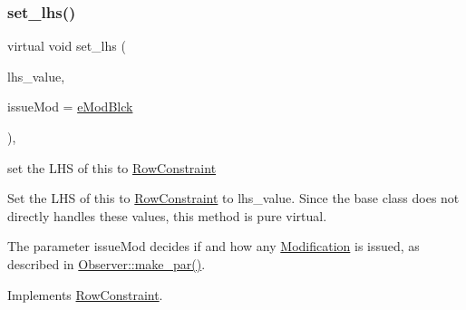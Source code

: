 \subsubsection{\texorpdfstring{set\+\_\+lhs()}{set\_lhs()}}
{\footnotesize\ttfamily virtual void set\+\_\+lhs (\begin{DoxyParamCaption}\item[{\mbox{\hyperlink{class_s_m_spp__di__unipi__it_1_1_row_constraint_a34abd4b01d3a2024be5f6d13dd88779f}{c\+\_\+\+R\+H\+S\+Value}}}]{lhs\+\_\+value,  }\item[{\mbox{\hyperlink{group___modification___t_y_p_e_s_ga544246d8c462e9a2d817c2c30797968f}{c\+\_\+\+Mod\+Param}}}]{issue\+Mod = {\ttfamily \mbox{\hyperlink{group___modification___t_y_p_e_s_gga48fddcdd03a03f49b7e389ca1ed938d4a21b14b26b1c0093a0905f6fc010bad29}{e\+Mod\+Blck}}} }\end{DoxyParamCaption})\hspace{0.3cm}{\ttfamily [override]}, {\ttfamily [virtual]}}



set the L\+HS of this to \mbox{\hyperlink{class_s_m_spp__di__unipi__it_1_1_row_constraint}{Row\+Constraint}} 

Set the L\+HS of this to \mbox{\hyperlink{class_s_m_spp__di__unipi__it_1_1_row_constraint}{Row\+Constraint}} to lhs\+\_\+value. Since the base class does not directly handles these values, this method is pure virtual.

The parameter issue\+Mod decides if and how any \mbox{\hyperlink{class_s_m_spp__di__unipi__it_1_1_modification}{Modification}} is issued, as described in \mbox{\hyperlink{class_s_m_spp__di__unipi__it_1_1_observer_a2d499ae38e5e95cf66cd71da32b0694a}{Observer\+::make\+\_\+par()}}. 

Implements \mbox{\hyperlink{class_s_m_spp__di__unipi__it_1_1_row_constraint_a1e707449bc5e308a84fbb17197e184a6}{Row\+Constraint}}.

\mbox{\label{class_s_m_spp__di__unipi__it_1_1_f_row_constraint_a921fe527a5e01a2f6568c3d5d233380a}} 
